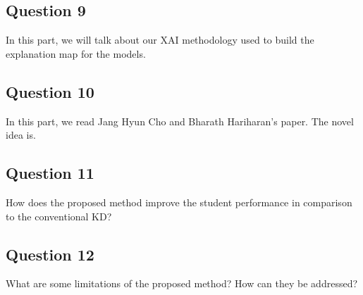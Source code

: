 \documentclass[conference]{IEEEtran}
\begin{document}
\subsection{Question 9}
In this part, we will talk about our XAI methodology used to build the explanation map for the models.
\subsection{Question 10}
In this part, we read Jang Hyun Cho and Bharath Hariharan's\cite{b2} paper. The novel idea is.
\subsection{Question 11}
How does the proposed method improve the student performance in comparison to the conventional KD?
\subsection{Question 12}
What are some limitations of the proposed method? How can they be addressed?
\end{document}
